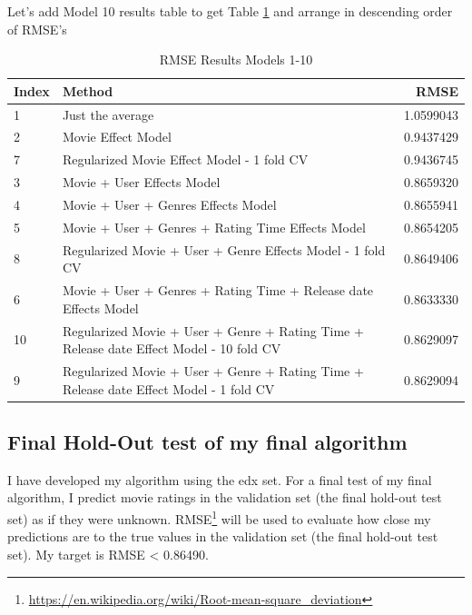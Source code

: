 \documentclass[
]{article}
\DeclareRobustCommand{\href}[2]{#2\footnote{\url{#1}}}
\begin{document}
Let's add Model 10 results table to get Table
\ref{tbl:rmse_results_model_1-10} and arrange in descending order of
RMSE's

\begin{table}[H]

\caption{\label{tab:m10_4}RMSE Results Models 1-10\label{tbl:rmse_results_model_1-10}}
\centering
\fontsize{7}{9}\selectfont
\begin{tabular}[t]{llr}
\toprule
Index & Method & RMSE\\
\midrule
1 & Just the average & 1.0599043\\
2 & Movie Effect Model & 0.9437429\\
7 & Regularized Movie Effect Model - 1 fold CV & 0.9436745\\
3 & Movie + User Effects Model & 0.8659320\\
4 & Movie + User + Genres Effects Model & 0.8655941\\
5 & Movie + User + Genres + Rating Time Effects Model & 0.8654205\\
8 & Regularized Movie + User + Genre Effects Model - 1 fold CV & 0.8649406\\
6 & Movie + User + Genres + Rating Time + Release date Effects Model & 0.8633330\\
10 & Regularized Movie + User + Genre + Rating Time + Release date Effect Model - 10 fold CV & 0.8629097\\
9 & Regularized Movie + User + Genre + Rating Time + Release date Effect Model - 1 fold CV & 0.8629094\\
\bottomrule
\end{tabular}
\end{table}

\newpage

\hypertarget{final-hold-out-test-of-my-final-algorithm}{%
\subsection{Final Hold-Out test of my final
algorithm}\label{final-hold-out-test-of-my-final-algorithm}}

I have developed my algorithm using the edx set. For a final test of my
final algorithm, I predict movie ratings in the validation set (the
final hold-out test set) as if they were unknown.
\href{https://en.wikipedia.org/wiki/Root-mean-square_deviation}{RMSE}
will be used to evaluate how close my predictions are to the true values
in the validation set (the final hold-out test set). My target is RMSE
\textless{} 0.86490.
\end{document}
